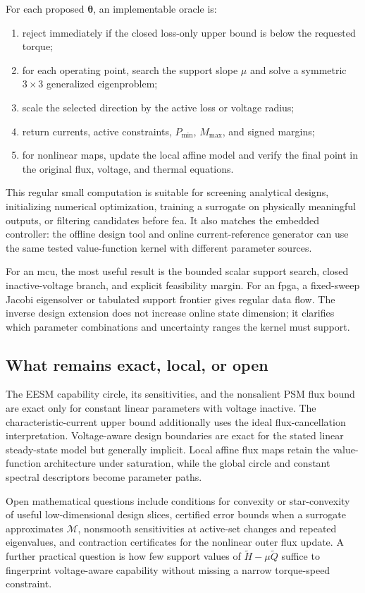 For each proposed \(\boldsymbol\theta\), an implementable oracle is:
\begin{enumerate}
 \item reject immediately if the closed loss-only upper bound is below the
       requested torque;
 \item for each operating point, search the support slope \(\mu\) and solve a
       symmetric \(3\times3\) generalized eigenproblem;
 \item scale the selected direction by the active loss or voltage radius;
 \item return currents, active constraints, \(P_{\min}\), \(M_{\max}\), and
       signed margins;
 \item for nonlinear maps, update the local affine model and verify the final
       point in the original flux, voltage, and thermal equations.
\end{enumerate}
This regular small computation is suitable for screening analytical designs,
initializing numerical optimization, training a surrogate on physically
meaningful outputs, or filtering candidates before \gls{fea}.  It also matches
the embedded controller: the offline design tool and online current-reference
generator can use the same tested value-function kernel with different
parameter sources.

For an \gls{mcu}, the most useful result is the bounded scalar support search,
closed inactive-voltage branch, and explicit feasibility margin.  For an
\gls{fpga}, a fixed-sweep Jacobi eigensolver or tabulated support frontier gives
regular data flow.  The inverse design extension does not increase online
state dimension; it clarifies which parameter combinations and uncertainty
ranges the kernel must support.

\subsection{What remains exact, local, or open}

The EESM capability circle, its sensitivities, and the nonsalient PSM flux
bound are exact only for constant linear parameters with voltage inactive.
The characteristic-current upper bound additionally uses the ideal
flux-cancellation interpretation.  Voltage-aware design boundaries are exact
for the stated linear steady-state model but generally implicit.  Local affine
flux maps retain the value-function architecture under saturation, while the
global circle and constant spectral descriptors become parameter paths.

Open mathematical questions include conditions for convexity or star-convexity
of useful low-dimensional design slices, certified error bounds when a
surrogate approximates \(\mathcal M\), nonsmooth sensitivities at active-set
changes and repeated eigenvalues, and contraction certificates for the
nonlinear outer flux update.  A further practical question is how few support
values of \(\widetilde H-\mu\widetilde Q\) suffice to fingerprint voltage-aware
capability without missing a narrow torque-speed constraint.

